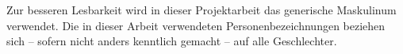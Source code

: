 Zur besseren Lesbarkeit wird in dieser Projektarbeit das generische Maskulinum verwendet. Die in dieser Arbeit verwendeten Personenbezeichnungen beziehen sich – sofern nicht anders kenntlich gemacht – auf alle Geschlechter.